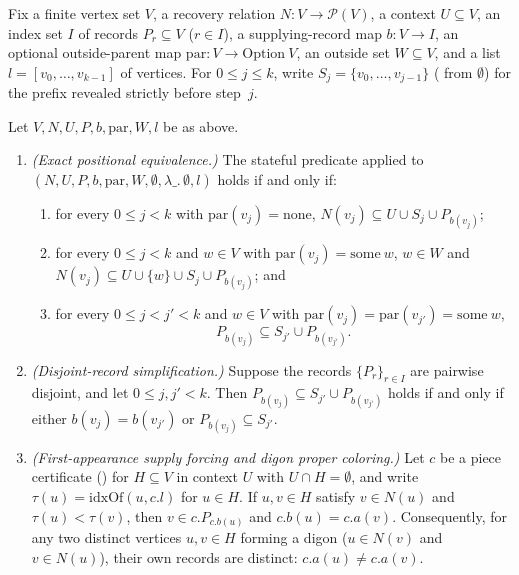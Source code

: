 Fix a finite vertex set $V$, a recovery relation $N : V \to \mathcal{P}(V)$, a context $U \subseteq V$, an index set $I$
of records $P_r \subseteq V$ ($r \in I$), a supplying-record map $b : V \to I$, an optional outside-parent map
$\mathrm{par} : V \to \mathrm{Option}\ V$, an outside set $W \subseteq V$, and a list $l = [v_0, \dots, v_{k-1}]$ of
vertices. For $0 \le j \le k$, write $S_j = \{v_0, \dots, v_{j-1}\}$ ( from $\emptyset$) for the
prefix revealed strictly before step~$j$.

\begin{proposition}\label{prop:PN}
Let $V, N, U, P, b, \mathrm{par}, W, l$ be as above.
\begin{enumerate}
\item \emph{(Exact positional equivalence.)} The stateful predicate
   applied to $(N, U, P, b, \mathrm{par}, W, \emptyset, \lambda\_.\,\emptyset, l)$ holds if and only if:
  \begin{enumerate}
  \item for every $0 \le j < k$ with $\mathrm{par}(v_j) = \mathrm{none}$, $N(v_j) \subseteq U \cup S_j \cup P_{b(v_j)}$;
  \item for every $0 \le j < k$ and $w \in V$ with $\mathrm{par}(v_j) = \mathrm{some}\ w$, $w \in W$ and
    $N(v_j) \subseteq U \cup \{w\} \cup S_j \cup P_{b(v_j)}$; and
  \item for every $0 \le j < j' < k$ and $w \in V$ with $\mathrm{par}(v_j) = \mathrm{par}(v_{j'}) = \mathrm{some}\ w$,
    \[
      P_{b(v_j)} \subseteq S_{j'} \cup P_{b(v_{j'})}.
    \]
  \end{enumerate}
\item \emph{(Disjoint-record simplification.)} Suppose the records $\{P_r\}_{r \in I}$ are pairwise disjoint, and let
  $0 \le j, j' < k$. Then $P_{b(v_j)} \subseteq S_{j'} \cup P_{b(v_{j'})}$ holds if and only if either
  $b(v_j) = b(v_{j'})$ or $P_{b(v_j)} \subseteq S_{j'}$.
\item \emph{(First-appearance supply forcing and digon proper coloring.)} Let $c$ be a piece certificate
  () for $H \subseteq V$ in context $U$ with $U \cap H = \emptyset$, and write $\tau(u) =
  \mathrm{idxOf}(u, c.l)$ for $u \in H$. If $u, v \in H$ satisfy $v \in N(u)$ and $\tau(u) < \tau(v)$, then
  $v \in c.P_{c.b(u)}$ and $c.b(u) = c.a(v)$. Consequently, for any two distinct vertices $u, v \in H$ forming a digon
  ($u \in N(v)$ and $v \in N(u)$), their own records are distinct: $c.a(u) \ne c.a(v)$.
\end{enumerate}
\end{proposition}

